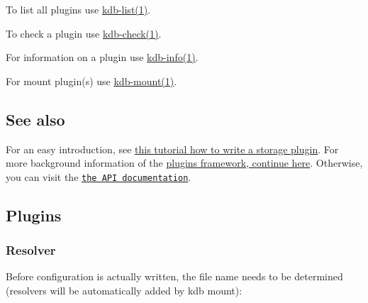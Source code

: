 \begin{DoxyItemize}
\item To list all plugins use \hyperlink{md_doc_help_kdb-list_doc_help_kdb-list_md}{kdb-\/list(1)}.
\item To check a plugin use \hyperlink{md_doc_help_kdb-check_doc_help_kdb-check_md}{kdb-\/check(1)}.
\item For information on a plugin use \hyperlink{md_doc_help_kdb-info_doc_help_kdb-info_md}{kdb-\/info(1)}.
\item For mount plugin(s) use \hyperlink{md_doc_help_kdb-mount_doc_help_kdb-mount_md}{kdb-\/mount(1)}.
\end{DoxyItemize}

\subsection*{See also}

For an easy introduction, see \hyperlink{doc_tutorials_plugins_md}{this tutorial how to write a storage plugin}. For more background information of the \hyperlink{doc_dev_plugins-framework_md}{plugins framework, continue here}. Otherwise, you can visit the \href{https://doc.libelektra.org/api/current/html/group__plugin.html}{\tt the A\+PI documentation}.

\subsection*{Plugins}

\subsubsection*{Resolver}

Before configuration is actually written, the file name needs to be determined (resolvers will be automatically added by kdb mount)\+:


